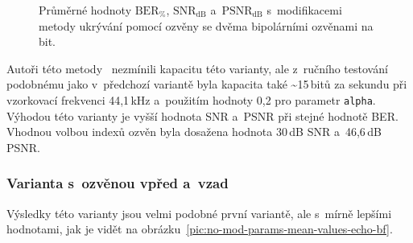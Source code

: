 \begin{figure}[H]
    \table
    \centering
    \caption{Průměrné hodnoty $\mathrm{BER}_{\%}$, $\mathrm{SNR}_\mathrm{dB}$
    a~$\mathrm{PSNR}_\mathrm{dB}$ s~modifikacemi metody ukrývání pomocí
    ozvěny se dvěma bipolárními ozvěnami na bit.}
    \label{pic:modifications-mean-values-echo-bipolar}
\end{figure}

Autoři této metody~\cite{Oh2001} nezmínili kapacitu této varianty, ale
z~ručního testování podobnému jako v~předchozí variantě byla kapacita také
\textasciitilde15\,bitů za sekundu při vzorkovací frekvenci 44,1\,kHz
a~použitím hodnoty 0,2 pro parametr \texttt{alpha}. Výhodou této varianty je
vyšší hodnota SNR a~PSNR při stejné hodnotě BER. Vhodnou volbou indexů ozvěn
byla dosažena hodnota 30\,dB SNR a~46,6\,dB PSNR.

\subsubsection*{Varianta s~ozvěnou vpřed a~vzad}

Výsledky této varianty jsou velmi podobné první variantě, ale s~mírně lepšími
hodnotami, jak je vidět na obrázku~\ref{pic:no-mod-params-mean-values-echo-bf}.

